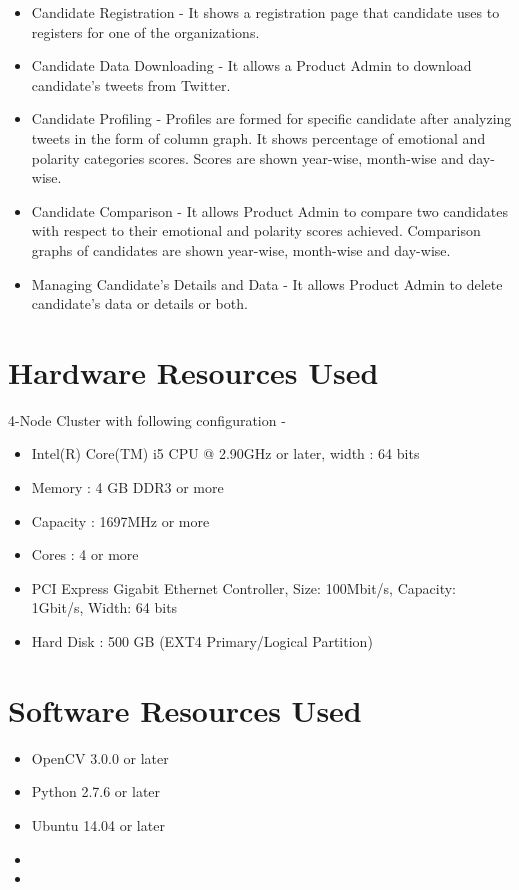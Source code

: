 \documentclass[oneside,a4paper,12pt]{pictreport}
\begin{document}
\begin{itemize}
\item Candidate Registration - It shows a registration page that candidate uses to registers for one of the organizations.
\item Candidate Data Downloading - It allows a Product Admin to download candidate's tweets from Twitter.
\item Candidate Profiling - Profiles are formed for specific candidate after analyzing tweets in the form of column graph. It shows percentage of emotional and polarity categories scores. Scores are shown year-wise, month-wise and day-wise.
\item Candidate Comparison - It allows Product Admin to compare two candidates with respect to their emotional and polarity scores achieved. Comparison graphs of candidates are shown year-wise, month-wise and day-wise.
\item Managing Candidate's Details and Data - It allows Product Admin to delete candidate's data or details or both.
\end{itemize}
\section{Hardware Resources Used}
4-Node Cluster with following configuration - 
\begin{itemize}
\item Intel(R) Core(TM) i5 CPU @ 2.90GHz or later, width : 64 bits 
\item Memory : 4 GB DDR3 or more 
\item Capacity : 1697MHz or more 
\item Cores : 4 or more 
\item PCI Express Gigabit Ethernet Controller, Size: 100Mbit/s, Capacity: 1Gbit/s, Width: 64 bits 
\item Hard Disk : 500 GB (EXT4 Primary/Logical Partition)
\end{itemize}


\section{Software Resources Used}
\begin{itemize}
\item OpenCV 3.0.0 or later
\item Python 2.7.6 or later
\item Ubuntu 14.04 or later
\item 
\item 

\end{itemize}
\end{document}

